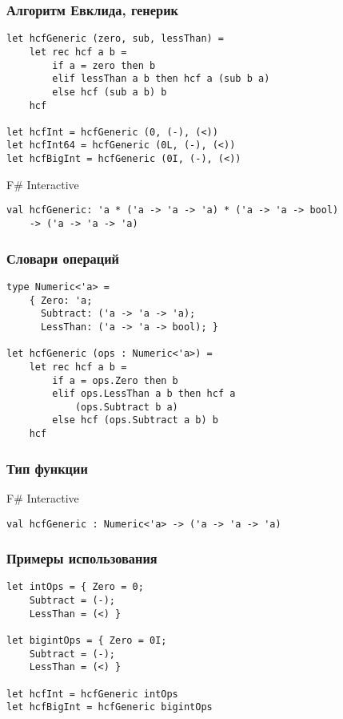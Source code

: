 \documentclass[xetex,mathserif,serif]{beamer}
\begin{document}
    \begin{frame}[fragile]
        \frametitle{Алгоритм Евклида, генерик}
        \begin{verbatim}
let hcfGeneric (zero, sub, lessThan) =
    let rec hcf a b =
        if a = zero then b
        elif lessThan a b then hcf a (sub b a)
        else hcf (sub a b) b
    hcf    
    
let hcfInt = hcfGeneric (0, (-), (<))
let hcfInt64 = hcfGeneric (0L, (-), (<))
let hcfBigInt = hcfGeneric (0I, (-), (<))
        \end{verbatim}

        \begin{alertblock}{F\# Interactive}
            \begin{verbatim}
val hcfGeneric: 'a * ('a -> 'a -> 'a) * ('a -> 'a -> bool) 
    -> ('a -> 'a -> 'a)
            \end{verbatim}
        \end{alertblock}
    \end{frame}

    \begin{frame}[fragile]
        \frametitle{Словари операций}
        \begin{verbatim}
type Numeric<'a> =
    { Zero: 'a;
      Subtract: ('a -> 'a -> 'a);
      LessThan: ('a -> 'a -> bool); }

let hcfGeneric (ops : Numeric<'a>) =
    let rec hcf a b =
        if a = ops.Zero then b
        elif ops.LessThan a b then hcf a 
            (ops.Subtract b a)
        else hcf (ops.Subtract a b) b
    hcf
        \end{verbatim}
    \end{frame}

    \begin{frame}[fragile]
        \frametitle{Тип функции}
        \begin{alertblock}{F\# Interactive}
            \begin{verbatim}
val hcfGeneric : Numeric<'a> -> ('a -> 'a -> 'a)
            \end{verbatim}
        \end{alertblock}
    \end{frame}

    \begin{frame}[fragile]
        \frametitle{Примеры использования}
        \begin{verbatim}
let intOps = { Zero = 0; 
    Subtract = (-); 
    LessThan = (<) }
    
let bigintOps = { Zero = 0I; 
    Subtract = (-); 
    LessThan = (<) }

let hcfInt = hcfGeneric intOps
let hcfBigInt = hcfGeneric bigintOps
        \end{verbatim}
    \end{frame}
\end{document}
